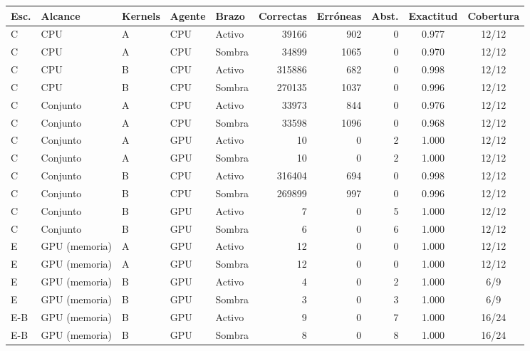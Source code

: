 \begin{tabular}{@{}lllllrrrcc@{}}
\toprule
\textbf{Esc.} & \textbf{Alcance} & \textbf{Kernels} & \textbf{Agente} & \textbf{Brazo} & \textbf{Correctas} & \textbf{Erróneas} & \textbf{Abst.} & \textbf{Exactitud} & \textbf{Cobertura} \\
\midrule
C & CPU & A & CPU & Activo & 39166 & 902 & 0 & 0.977 & 12/12 \\
C & CPU & A & CPU & Sombra & 34899 & 1065 & 0 & 0.970 & 12/12 \\
C & CPU & B & CPU & Activo & 315886 & 682 & 0 & 0.998 & 12/12 \\
C & CPU & B & CPU & Sombra & 270135 & 1037 & 0 & 0.996 & 12/12 \\
C & Conjunto & A & CPU & Activo & 33973 & 844 & 0 & 0.976 & 12/12 \\
C & Conjunto & A & CPU & Sombra & 33598 & 1096 & 0 & 0.968 & 12/12 \\
C & Conjunto & A & GPU & Activo & 10 & 0 & 2 & 1.000 & 12/12 \\
C & Conjunto & A & GPU & Sombra & 10 & 0 & 2 & 1.000 & 12/12 \\
C & Conjunto & B & CPU & Activo & 316404 & 694 & 0 & 0.998 & 12/12 \\
C & Conjunto & B & CPU & Sombra & 269899 & 997 & 0 & 0.996 & 12/12 \\
C & Conjunto & B & GPU & Activo & 7 & 0 & 5 & 1.000 & 12/12 \\
C & Conjunto & B & GPU & Sombra & 6 & 0 & 6 & 1.000 & 12/12 \\
E & GPU (memoria) & A & GPU & Activo & 12 & 0 & 0 & 1.000 & 12/12 \\
E & GPU (memoria) & A & GPU & Sombra & 12 & 0 & 0 & 1.000 & 12/12 \\
E & GPU (memoria) & B & GPU & Activo & 4 & 0 & 2 & 1.000 & 6/9 \\
E & GPU (memoria) & B & GPU & Sombra & 3 & 0 & 3 & 1.000 & 6/9 \\
E-B & GPU (memoria) & B & GPU & Activo & 9 & 0 & 7 & 1.000 & 16/24 \\
E-B & GPU (memoria) & B & GPU & Sombra & 8 & 0 & 8 & 1.000 & 16/24 \\
\bottomrule
\end{tabular}

